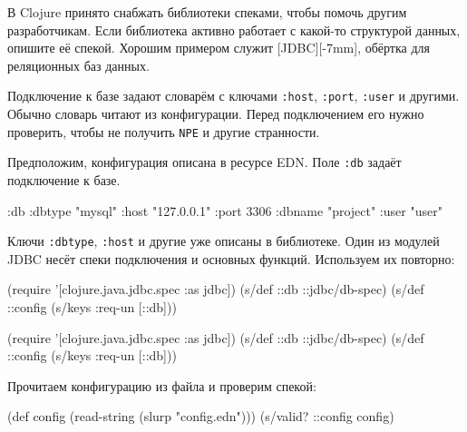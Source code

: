 
В Clojure принято снабжать библиотеки спеками, чтобы помочь другим
разработчикам. Если библиотека активно работает с какой-то структурой данных,
опишите её спекой. Хорошим примером служит
[JDBC][-7mm], обёртка для реляционных
баз данных.

Подключение к базе задают словарём с ключами \verb|:host|, \verb|:port|,
\verb|:user| и другими. Обычно словарь читают из конфигурации. Перед
подключением его нужно проверить, чтобы не получить \verb|NPE| и другие
странности.


Предположим, конфигурация описана в ресурсе EDN. Поле \verb|:db| задаёт
подключение к базе.


\begin{english}
  \begin{clojure}
{:db {:dbtype "mysql"
      :host "127.0.0.1"
      :port 3306
      :dbname "project"
      :user "user"}}
  \end{clojure}
\end{english}

Ключи \verb|:dbtype|, \verb|:host| и другие уже описаны в библиотеке. Один
из модулей JDBC несёт спеки подключения и основных функций. Используем их
повторно:

\ifx\DEVICETYPE\MOBILE

\begin{english}
  \begin{clojure}
(require
  '[clojure.java.jdbc.spec :as jdbc])
(s/def ::db ::jdbc/db-spec)
(s/def ::config (s/keys :req-un [::db]))
  \end{clojure}
\end{english}

\else

\begin{english}
  \begin{clojure}
(require '[clojure.java.jdbc.spec :as jdbc])
(s/def ::db ::jdbc/db-spec)
(s/def ::config (s/keys :req-un [::db]))
  \end{clojure}
\end{english}

\fi

\noindent
Прочитаем конфигурацию из файла и проверим спекой:

\ifx\DEVICETYPE\MOBILE

\begin{english}
  \begin{clojure}
(def config
  (read-string (slurp "config.edn")))
(s/valid? ::config config)
  \end{clojure}
\end{english}

